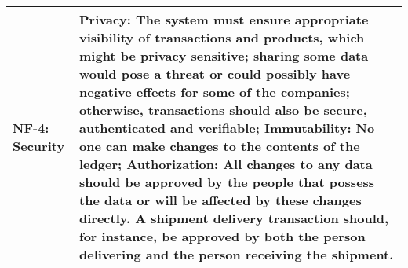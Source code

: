 \begin{table}[H]
\begin{tabular}{|p{3cm}|p{12cm}|}
\hline
NF-4: Security & 
\textbf{Privacy}: The system must ensure appropriate visibility of transactions and products, which might be privacy sensitive; sharing some data would pose a threat or could possibly have negative effects for some of the companies; otherwise, transactions should also be secure, authenticated and verifiable; \newline
\textbf{Immutability}: No one can make changes to the contents of the ledger;\newline
\textbf{Authorization}: All changes to any data should be approved by the people that possess the data or will be affected by these changes directly. A shipment delivery transaction should, for instance, be approved by both the person delivering and the person receiving the shipment. \\
\hline
\end{tabular}
\end{table}
